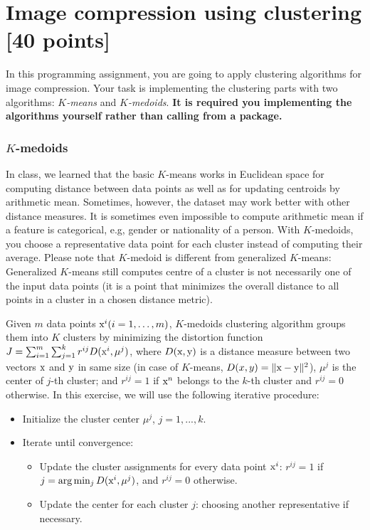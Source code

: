 \documentclass[twoside,10pt]{article}
\begin{document}
\section{Image compression using clustering [40 points]}

In this programming assignment, you are going to apply clustering algorithms for image compression. Your task is implementing the clustering parts with two algorithms: \emph{$K$-means} and \emph{$K$-medoids}.  {\bf It is required you implementing the algorithms yourself rather than calling from a package.} %

\subsubsection*{$K$-medoids}

In class, we learned that the basic $K$-means works in Euclidean space for computing distance between data points as well as for updating centroids by arithmetic mean. Sometimes, however, the dataset may work better with other distance measures. It is sometimes even impossible to compute arithmetic mean if a feature is categorical, e.g, gender or nationality of a person. With $K$-medoids, you choose a representative data point for each cluster instead of computing their average. Please note that $K$-medoid is different from generalized $K$-means: Generalized $K$-means still computes centre of a cluster is not necessarily one of the input data points (it is a point that minimizes the overall distance to all points in a cluster in a chosen distance metric). 

Given $m$ data points $\text x^i (i = 1, \ldots, m)$, $K$-medoids clustering algorithm groups them into $K$ clusters by minimizing the distortion function $J = \sum_{i=1}^m \sum_{j=1}^k r^{ij} D(\text x^i, \mu^j)$,
where $D(\text x, \text y)$ is a distance measure between two vectors $\text x$ and $\text y$ in same size (in case of $K$-means, $D(x, y) = \| \text x - \text y \|^2$), $\mu^j$ is the center of $j$-th cluster; and $r^{ij} = 1$ if $\text x^n$ belongs to the $k$-th cluster and $r^{ij} = 0$ otherwise. In this exercise, we will use the following iterative procedure:

\begin{itemize}
  \item Initialize the cluster center $\mu^j$, $j = 1, ..., k$.
  \item Iterate until convergence:
  \begin{itemize}
    \item Update the cluster assignments for every data point $\text x^i$: $r^{ij} = 1$ if $j = \arg\min_j D(\text x^i, \mu^j)$, and $r^{ij} = 0$ otherwise.
    \item Update the center for each cluster $j$: choosing another representative if necessary.
  \end{itemize}
\end{itemize}
\end{document}
